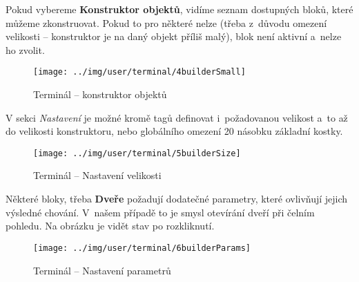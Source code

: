 \FloatBarrier

Pokud vybereme \textbf{Konstruktor objektů}, vidíme seznam dostupných bloků, které můžeme zkonstruovat. Pokud to pro některé nelze (třeba z~důvodu omezení velikosti -- konstruktor je na daný objekt příliš malý), blok není aktivní a~nelze ho zvolit.


\begin{figure}[!ht]\centering
\texttt{[image: ../img/user/terminal/4builderSmall]}

\caption{Terminál -- konstruktor objektů}
\label{fig:user_terminal_4builderSmall}

\end{figure}

\FloatBarrier

V sekci \textit{Nastavení} je možné kromě tagů definovat i~požadovanou velikost a~to až do velikosti konstruktoru, nebo globálního omezení 20 násobku základní kostky.

\begin{figure}[!ht]\centering
\texttt{[image: ../img/user/terminal/5builderSize]}

\caption{Terminál -- Nastavení velikosti}
\label{fig:user_terminal_5builderSize}

\end{figure}

\FloatBarrier

Některé bloky, třeba \textbf{Dveře} požadují dodatečné parametry, které ovlivňují jejich výsledné chování. V~našem případě to je smysl otevírání dveří při čelním pohledu. Na obrázku je vidět stav po rozkliknutí.

\begin{figure}[!ht]\centering
\texttt{[image: ../img/user/terminal/6builderParams]}

\caption{Terminál -- Nastavení parametrů}
\label{fig:user_terminal_6builderParams}

\end{figure}

\FloatBarrier